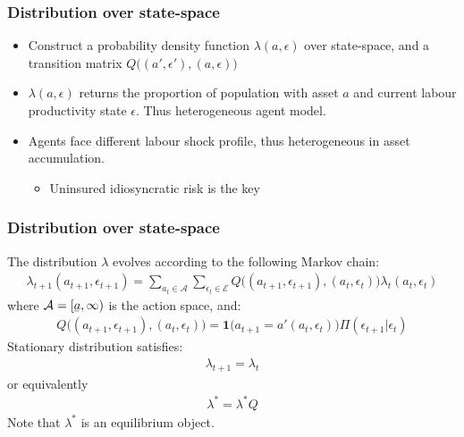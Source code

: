 \documentclass{beamer}
\newcommand{\ubar}[1]{\underaccent{\bar}{#1}}
\begin{document}
\begin{frame}
\frametitle{Distribution over state-space} 
\begin{itemize}
	\item Construct a probability density function $\lambda(a,\epsilon)$ over state-space, and a transition matrix 
	$Q\big( (a',\epsilon'), (a,\epsilon) \big)$
	\item $\lambda(a,\epsilon)$ returns the proportion of population with asset $a$ and current labour productivity state $\epsilon$. Thus heterogeneous agent model. 
	\item Agents face different labour shock profile, thus heterogeneous in asset accumulation. 
	\begin{itemize}
		\item Uninsured idiosyncratic risk is the key 
	\end{itemize}
\end{itemize}
\end{frame}




\begin{frame}
\frametitle{Distribution over state-space} 
The distribution $\lambda$ evolves according to the following Markov chain: 
\begin{equation}
\begin{aligned}
\lambda_{t+1}(a_{t+1},\epsilon_{t+1}) 
= 
\sum_{a_{t} \in \mathcal{A}} 
\sum_{\epsilon_{t} \in \mathcal{E}} 
Q\big( (a_{t+1},\epsilon_{t+1}),(a_t,\epsilon_t) \big)
\lambda_{t}(a_t,\epsilon_t)
\end{aligned}
\end{equation}
where $\mathcal{A} = [\ubar{a},\infty) $ is the action space, and: 
\begin{equation}
\begin{aligned}
Q\big( (a_{t+1},\epsilon_{t+1}),(a_t,\epsilon_t) \big) 
= \bm{1} \big( a_{t+1} = a'(a_t,\epsilon_t)  \big) \Pi(\epsilon_{t+1}|\epsilon_t) 
\end{aligned}
\end{equation}
Stationary distribution satisfies: 
\begin{equation}
\begin{aligned}
\lambda_{t+1} = \lambda_t
\end{aligned}
\end{equation}
or equivalently
\begin{equation}
\begin{aligned}
\lambda^* = \lambda^* Q
\end{aligned}
\end{equation}
Note that $\lambda^*$ is an equilibrium object. 

\end{frame}
\end{document}

